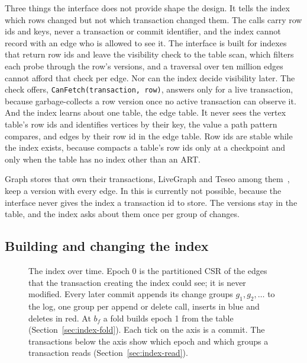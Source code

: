 Three things the interface does not provide shape the design. It tells the index which rows changed but not
which transaction changed them. The calls carry row ids and keys, never a transaction or commit identifier, and the
index cannot record with an edge who is allowed to see it. The interface is built for indexes that return row ids and
leave the visibility check to the table scan, which filters each probe through the row's versions, and a traversal
over ten million edges cannot afford that check per edge. Nor can the index decide visibility later. The check
\duckdb offers, \texttt{CanFetch(transaction, row)}, answers only for a live transaction, because \duckdb
garbage-collects a row version once no active transaction can observe it. And the index learns about one table, the
edge table. It never sees the vertex table's row ids and identifies vertices by their key, the value a path pattern
compares, and edges by their row id in the edge table. Row ids are stable while the index exists, because
\duckdb compacts a table's row ids only at a checkpoint and only when the table has no index other than an ART.

Graph stores that own their transactions, LiveGraph and Teseo among them~\cite{zhu2020livegraph,deleo2021teseo}, keep
a version with every edge. In \duckdb this is currently not possible, because the interface never gives the index a
transaction id to store. The versions stay in the table, and the index asks \duckdb about them once per group of
changes.

\subsection{Building and changing the index}
\label{sec:index-structure}

\begin{figure}[t]
  \centering
  
  \caption{The index over time. Epoch 0 is the partitioned CSR of the edges that the transaction creating the index
  could see; it is never modified. Every later commit appends its change groups $g_1, g_2, \dots$ to the log, one
  group per append or delete call, inserts in blue and deletes in red. At $b_f$ a fold builds epoch 1 from the table
  (Section~\ref{sec:index-fold}). Each tick on the axis is a commit. The transactions below the axis show which epoch and which
  groups a transaction reads (Section~\ref{sec:index-read}).}
  \label{fig:index-timeline}
\end{figure}

